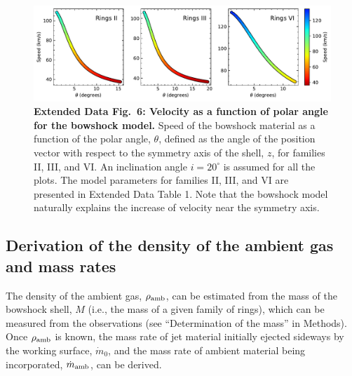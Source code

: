 \documentclass[12pt]{mythesis}
\begin{document}
\begin{figure}[p!] 
\begin{centering}
\includegraphics[width=\textwidth]{figures/speed_theta_bowshock.pdf} 
\caption[Velocity as a function of the polar angle for the bowshock model]{{\bf Extended Data Fig.\ 6: Velocity as a function of polar angle for the bowshock model.} Speed of the bowshock material as a function of the polar angle, $\theta$, defined as the angle of the position vector with respect to the symmetry axis of the shell, $z$, for families II, III, and VI. An inclination angle  $i=20^\circ$ is assumed for all the plots. The model parameters for families II, III, and VI are presented in Extended Data Table 1.
 Note that the bowshock model naturally explains the increase of velocity near the symmetry axis.
\label{fig:v_theta}
}
\end{centering}
\end{figure}



\subsection{Derivation of the density of the ambient gas and mass rates}

The density of the ambient gas, $\rho_{\rm amb}$, can be estimated from the mass of the bowshock shell, $M$ (i.e., the mass of a given family of rings), which can be measured from the observations (see ``Determination of the mass'' in Methods). Once $\rho_{\rm amb}$ is known, the mass rate of jet material initially ejected sideways by the working surface, $\dot{m}_0$, and the mass rate of ambient material being incorporated, $\dot{m}_{\rm amb}$, can be derived.

\end{document}
